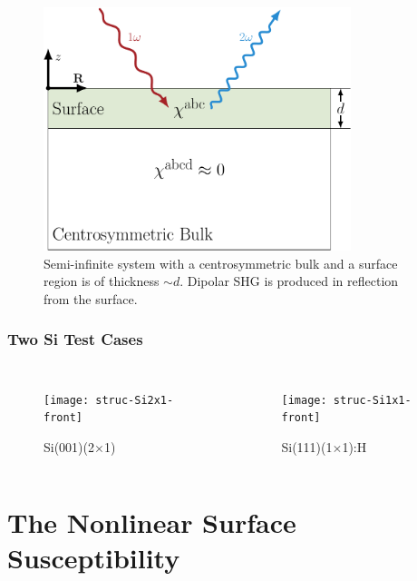 \documentclass{beamer}
\begin{document}
\begin{frame}
\begin{figure}
\centering
\includegraphics[width=0.8\textwidth]{diag-system}
\caption{Semi-infinite system with a centrosymmetric bulk and a surface region
is of thickness $\sim d$. Dipolar SHG is produced in reflection from the
surface.}
\end{figure}
\end{frame}

\begin{frame}
\frametitle{Two Si Test Cases}
\begin{columns}
\begin{figure}
\centering
\texttt{[image: struc-Si2x1-front]}
\vspace{-0.4cm}
\caption{Si(001)(2$\times$1)}
\end{figure}
\begin{figure}
\centering
\texttt{[image: struc-Si1x1-front]}
\vspace{-0.4cm}
\caption{Si(111)(1$\times$1):H}
\end{figure}
\end{columns}
\end{frame}



\section{The Nonlinear Surface Susceptibility}


\end{document}
